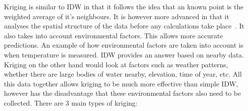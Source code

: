 Kriging is similar to IDW in that it follows the idea that an known point is the weighted average of it's neighbours. It is however more advanced in that it analyses the spatial structure of the data before any calculations take place~\cite{geostatisticalradiomapping}. It also takes into account environmental factors. This allows more accurate predictions. An example of how environmental factors are taken into account is when temperature is measured. IDW provides an answer based on nearby data. Kriging on the other hand would look at factors such as weather patterns, whether there are large bodies of water nearby, elevation, time of year, etc. All this data together allows kriging to be much more effective than simple IDW, however has the disadvantage that these environmental factors also need to be collected. There are 3 main types of kriging:

